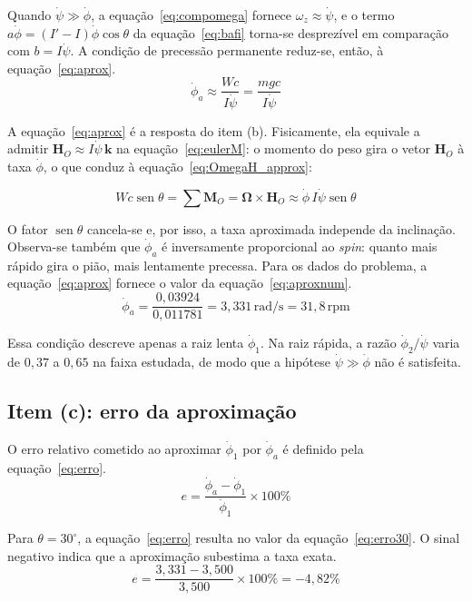 \documentclass[12pt,a4paper]{article}
\newcommand{\vet}[1]{\mathbf{#1}}
\newcommand{\vOmega}{\boldsymbol{\Omega}}
\newcommand{\seno}{\operatorname{sen}}
\newcommand{\un}[1]{\,\mathrm{#1}}
\newcommand{\phid}{\dot{\phi}}
\newcommand{\psid}{\dot{\psi}}
\begin{document}
Quando $\psid\gg\phid$, a equação~\ref{eq:compomega} fornece $\omega_z\approx\psid$, e o termo $a\phid=(I'-I)\phid\cos\theta$ da equação~\ref{eq:bafi} torna-se desprezível em comparação com $b=I\psid$. A condição de precessão permanente reduz-se, então, à equação~\ref{eq:aprox}.
\begin{equation}
\phid_a \approx \frac{Wc}{I\psid} = \frac{mgc}{I\psid}
\label{eq:aprox}
\end{equation}

A equação~\ref{eq:aprox} é a resposta do item (b). Fisicamente, ela equivale a admitir $\vet{H}_O\approx I\psid\,\vet{k}$ na equação~\ref{eq:eulerM}: o momento do peso gira o vetor $\vet{H}_O$ à taxa $\phid$, o que conduz à equação~\ref{eq:OmegaH_approx}:

\begin{equation}
Wc\seno\theta=\sum\vet{M}_O = \vOmega\times\vet{H}_O \approx \phid\,I\psid\seno\theta
\label{eq:OmegaH_approx}
\end{equation}

O fator $\seno\theta$ cancela-se e, por isso, a taxa aproximada independe da inclinação. Observa-se também que $\phid_a$ é inversamente proporcional ao \textit{spin}: quanto mais rápido gira o pião, mais lentamente precessa. Para os dados do problema, a equação~\ref{eq:aprox} fornece o valor da equação~\ref{eq:aproxnum}.
\begin{equation}
\phid_a = \frac{0,03924}{0,011781} = 3,331\un{rad/s} = 31,8\un{rpm}
\label{eq:aproxnum}
\end{equation}

Essa condição descreve apenas a raiz lenta $\phid_1$. Na raiz rápida, a razão $\phid_2/\psid$ varia de $0,37$ a $0,65$ na faixa estudada, de modo que a hipótese $\psid\gg\phid$ não é satisfeita.

\subsection{Item (c): erro da aproximação}

O erro relativo cometido ao aproximar $\phid_1$ por $\phid_a$ é definido pela equação~\ref{eq:erro}.
\begin{equation}
e = \frac{\phid_a-\phid_1}{\phid_1}\times100\%
\label{eq:erro}
\end{equation}

Para $\theta=30^\circ$, a equação~\ref{eq:erro} resulta no valor da equação~\ref{eq:erro30}. O sinal negativo indica que a aproximação subestima a taxa exata.
\begin{equation}
e = \frac{3,331-3,500}{3,500}\times100\% = -4,82\%
\label{eq:erro30}
\end{equation}
\end{document}
